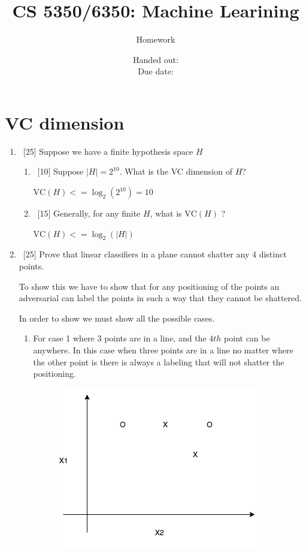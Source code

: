 \documentclass[12pt, fullpage,letterpaper]{article}
\title{CS 5350/6350: Machine Learining \semester}
\author{Homework \assignmentId}
\date{Handed out: \releaseDate\\
  Due date: \dueDate}
\DeclareMathOperator{\Hcal}{\mathcal{H}}
\begin{document}
\maketitle





\section{VC dimension}
\begin{enumerate}
\item~[25] Suppose we have a finite hypothesis space $H$%
\begin{enumerate}
\item~[10] Suppose $|H| = 2^{10}$. What is the VC dimension of $H$?

    $\mathrm{VC}(H) <= \log_2(2^{10}) = 10$\\

\item~[15] Generally, for  any finite $H$, what is $\mathrm{VC}(H)$ ?

    $\mathrm{VC}(H) <= \log_2(|H|)$

\end{enumerate}
\item~[25] Prove that linear classifiers in a plane cannot shatter any $4$ distinct points.

    To show this we have to show that for any positioning of the points an adversarial can label the points in
    such a way that they cannot be shattered.

    In order to show we must show all the possible cases.

    \pagebreak
    \begin{enumerate}

    \item For case 1 where 3 points are in a line, and the $4th$ point can be anywhere. In this case when three points are in
    a line no matter where the other point is there is always a labeling that will not shatter the positioning.

    \begin{figure}[h]
        \centering
        \includegraphics[scale=.5]{all_in_line.png}
    \end{figure}



\end{enumerate}
\end{enumerate}
\end{document}
